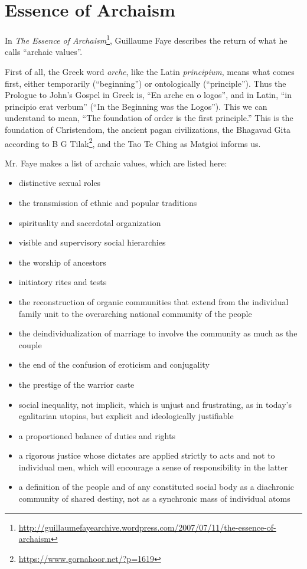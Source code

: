 \section{Essence of Archaism}

In \textit{The Essence of Archaism}\footnote{\url{http://guillaumefayearchive.wordpress.com/2007/07/11/the-essence-of-archaism}}, Guillaume Faye describes the return of what he calls ``archaic values''.

First of all, the Greek word \textit{arche}, like the Latin \textit{principium}, means what comes first, either temporarily (``beginning'') or ontologically (``principle''). Thus the Prologue to John's Gospel in Greek is, ``En arche en o logos'', and in Latin, ``in principio erat verbum'' (``In the Beginning was the Logos''). This we can understand to mean, ``The foundation of order is the first principle.'' This is the foundation of Christendom, the ancient pagan civilizations, the Bhagavad Gita according to B G Tilak\footnote{\url{https://www.gornahoor.net/?p=1619}}, and the Tao Te Ching as Matgioi informs us.

Mr. Faye makes a list of archaic values, which are listed here:
\begin{itemize}
\item distinctive sexual roles
\item    the transmission of ethnic and popular traditions
\item    spirituality and sacerdotal organization
\item    visible and supervisory social hierarchies
\item    the worship of ancestors
\item    initiatory rites and tests
\item    the reconstruction of organic communities that extend from the individual family unit to the overarching national community of the people
\item    the deindividualization of marriage to involve the community as much as the couple
\item    the end of the confusion of eroticism and conjugality
\item    the prestige of the warrior caste
\item    social inequality, not implicit, which is unjust and frustrating, as in today’s egalitarian utopias, but explicit and ideologically justifiable
\item    a proportioned balance of duties and rights
\item    a rigorous justice whose dictates are applied strictly to acts and not to individual men, which will encourage a sense of responsibility in the latter
\item    a definition of the people and of any constituted social body as a diachronic community of shared destiny, not as a synchronic mass of individual atoms
\end{itemize}

